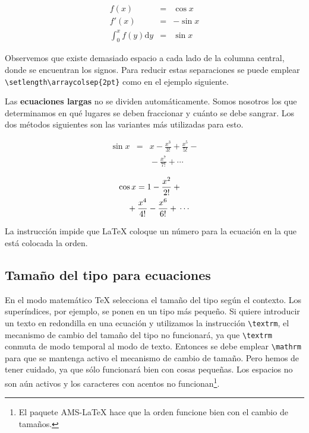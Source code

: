 \begin{example}
\begin{eqnarray}
f(x) & = & \cos x       \\
f'(x) & = & -\sin x     \\
\int_{0}^{x} f(y) \mathrm{d}y &
 = & \sin x
\end{eqnarray}
\end{example}

\noindent Observemos  que existe demasiado  espacio a cada lado  de la
columna central,  donde se encuentran  los signos. Para  reducir estas
separaciones se puede  emplear \verb|\setlength\arraycolsep{2pt}| como
en el ejemplo siguiente.

 Las  \textbf{ecuaciones largas} no se
dividen automáticamente.  Somos nosotros  los que determinamos  en qué
lugares se deben fraccionar y cuánto  se debe sangrar. Los dos métodos
siguientes son las variantes más utilizadas para esto.

\begin{example}
{\setlength\arraycolsep{2pt}
\begin{eqnarray}
\sin x & = & x -\frac{x^{3}}{3!}
     +\frac{x^{5}}{5!}-{}
                    \nonumber\\
 & & {}-\frac{x^{7}}{7!}+{}\cdots
\end{eqnarray}}
\end{example}
\pagebreak[1]

\begin{example}
\begin{eqnarray}
\lefteqn{ \cos x = 1
     -\frac{x^{2}}{2!} +{} }
                    \nonumber\\
 & & {}+\frac{x^{4}}{4!}
     -\frac{x^{6}}{6!}+{}\cdots
\end{eqnarray}
\end{example}

\enlargethispage{\baselineskip}  La  instrucción   impide
que  \LaTeX{} coloque  un  número  para la  ecuación  en  la que  está
colocada la orden.


\subsection{Tamaño del tipo para ecuaciones}

  En el
modo  matemático  \TeX{}  selecciona  el  tamaño  del  tipo  según  el
contexto.  Los superíndices,  por ejemplo,  se  ponen en  un tipo  más
pequeño. Si quiere introducir un texto en redondilla en una ecuación y
utilizamos la  instrucción \verb|\textrm|, el mecanismo  de cambio del
tamaño del tipo  no funcionará, ya que \verb|\textrm|  conmuta de modo
temporal al  modo de  texto. Entonces  se debe  emplear \verb|\mathrm|
para que  se mantenga activo  el mecanismo  de cambio de  tamaño. Pero
hemos de  tener cuidado, ya  que  sólo funcionará  bien con
cosas pequeñas. Los  espacios no son aún activos y  los caracteres con
acentos  no funcionan\footnote{El  paquete  AMS-\LaTeX{}  hace que  la
orden  funcione bien con el cambio de tamaños.}.


